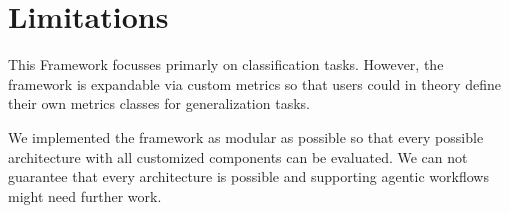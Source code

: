\section{Limitations}

This Framework focusses primarly on classification tasks. However, the framework is expandable via custom metrics so that users could in theory define their own metrics classes for generalization tasks. 

We implemented the framework as modular as possible so that every possible architecture with all customized components can be evaluated. We can not guarantee that every architecture is possible and supporting agentic workflows might need further work.




